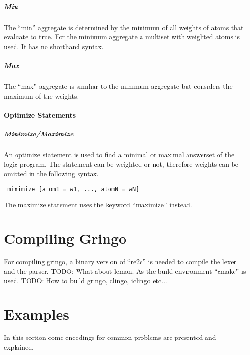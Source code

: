 \documentclass[a4paper,10pt]{article}
\begin{document}
\subparagraph{Min}
The ``min'' aggregate is determined by the minimum of all weights of atoms that evaluate to true.
For the minimum aggregate a multiset with weighted atoms is used. It has no shorthand syntax.
\subparagraph{Max}
The ``max'' aggregate is similiar to the minimum aggregate but considers the maximum of the weights.

\paragraph{Optimize Statements}

\subparagraph{Minimize/Maximize}
An optimize statement is used to find a minimal or maximal answerset of the logic program.
The statement can be weighted or not, therefore weights can be omitted in the following syntax.
\begin{verbatim}
 minimize [atom1 = w1, ..., atomN = wN].
\end{verbatim}
The maximize statement uses the keyword ``maximize'' instead.

\section{Compiling Gringo}
For compiling gringo, a binary version of ``re2c'' is needed to compile the lexer and the parser.
TODO: What about lemon.
As the build environment ``cmake'' is used.
TODO: How to build gringo, clingo, iclingo etc...

\section{Examples}
In this section come encodings for common problems are presented and explained.
\end{document}
